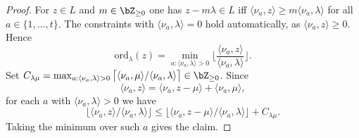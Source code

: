 \documentclass[12pt,a4paper]{amsart}%
\newcommand{\RamiB}[1]{{{#1}}}
\begin{document}
\begin{proof}
    For $z\in L$ and $m\in\Z_{\geq0}$ one has $z-m\RamiB{\lambda}\in L$ iff $\langle\nu_a,z\rangle\geq m\langle\nu_a,\RamiB{\lambda}\rangle$ for all $a\RamiB{\in \{1,\dots,t\}}$. The constraints with $\langle\nu_a,\RamiB{\lambda}\rangle=0$ hold automatically, as $\langle\nu_a,z\rangle\geq0$. Hence
    $$\mathrm{ord}_{\RamiB{\lambda}}(z)=\min_{a:\langle\nu_a,\RamiB{\lambda}\rangle>0}\Big\lfloor\frac{\langle\nu_a,z\rangle}{\langle\nu_a,\RamiB{\lambda}\rangle}\Big\rfloor.$$
    Set $\RamiB{C_{\lambda\mu}}=\max_{a:\langle\nu_a,\RamiB{\lambda}\rangle>0}\big\lceil\langle\nu_a,\RamiB{\mu}\rangle/\langle\nu_a,\RamiB{\lambda}\rangle\big\rceil\in\Z_{\geq0}$. Since $$\langle\nu_a,z\rangle=\langle\nu_a,z-\RamiB{\mu}\rangle+\langle\nu_a,\RamiB{\mu}\rangle,$$ for each $a$ with $\langle\nu_a,\RamiB{\lambda}\rangle>0$ we have $$\lfloor\langle\nu_a,z\rangle/\langle\nu_a,\RamiB{\lambda}\rangle\rfloor\leq\lfloor\langle\nu_a,z-\RamiB{\mu}\rangle/\langle\nu_a,\RamiB{\lambda}\rangle\rfloor+\RamiB{C_{\lambda\mu}}.$$ Taking the minimum over such $a$ gives the claim.
\end{proof}
\end{document}
